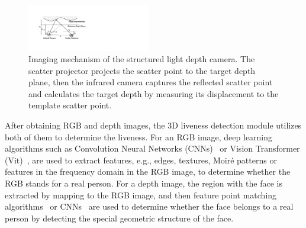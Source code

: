 %


\begin{figure}[!t]
	\centering
	\includegraphics[width=0.48\textwidth]{figures/imaging_mechanism.pdf} 
	\vspace{-0.1in}
	\caption{Imaging mechanism of the structured light depth camera. The scatter projector projects the scatter point to the target depth plane, then the infrared camera captures the reflected scatter point and calculates the target depth by measuring its displacement to the template scatter point. }
	\label{imaging_mechanism}
	\vspace{-0.15in}
\end{figure}

After obtaining RGB and depth images, the 3D liveness detection module utilizes both of them to determine the liveness.
For an RGB image, deep learning algorithms such as Convolution Neural Networks (CNNs)~\cite{yang2014learn, chen2020face, luo2018face} or Vision Transformer (Vit)~\cite{george2020effectiveness}, are used to extract features, e.g., edges, textures, Moiré patterns or features in the frequency domain in the RGB image, to determine whether the RGB stands for a real person.
For a depth image, the region with the face is extracted by mapping to the RGB image, and then feature point matching algorithms~\cite{goswami2014rgb} or CNNs~\cite{george2021cross, te2020exploring} are used to determine whether the face belongs to a real person by detecting the special geometric structure of the face. 

